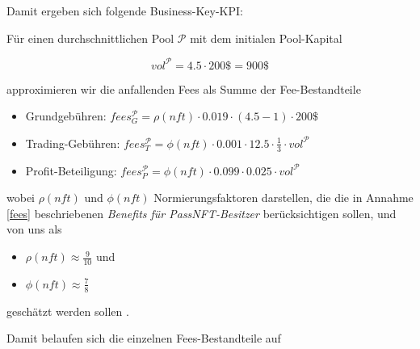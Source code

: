 \vspace{0.5cm}

Damit ergeben sich folgende Business-Key-KPI:

\vspace{0.3cm}

\begin{Fazit}

\vspace{0.75cm}


\vspace{0.75cm}

Für einen durchschnittlichen Pool $\mathcal{P}$ mit dem initialen Pool-Kapital

\begin{equation*}
  vol^{\mathcal{P}} = 4.5 \cdot 200\$ = 900\$ 
\end{equation*}

approximieren wir die anfallenden Fees als Summe der Fee-Bestandteile

\begin{itemize}
	\item Grundgebühren: $fees_{G}^{\mathcal{P}} = \rho(nft) \cdot 0.019 \cdot (4.5 - 1) \cdot 200\$ $
	\item Trading-Gebühren: $fees_{T}^{\mathcal{P}} = \phi(nft) \cdot 0.001 \cdot 12.5 \cdot \frac{1}{3} \cdot vol^{\mathcal{P}} $
	\item Profit-Beteiligung: $fees_{P}^{\mathcal{P}} = \phi(nft) \cdot 0.099 \cdot 0.025 \cdot vol^{\mathcal{P}} $
\end{itemize}

wobei $\rho(nft)$ und $\phi(nft)$ Normierungsfaktoren darstellen, die die in Annahme \ref{fees} beschriebenen \textit{Benefits für PassNFT-Besitzer} berücksichtigen sollen, und von uns als 

\begin{itemize}
	\item $\rho(nft) \approx \frac{9}{10}$ und 
	\item $\phi(nft) \approx \frac{7}{8}$
\end{itemize}	

geschätzt werden sollen .

\vspace{0.2cm}

Damit belaufen sich die einzelnen Fees-Bestandteile auf 


\end{Fazit}
